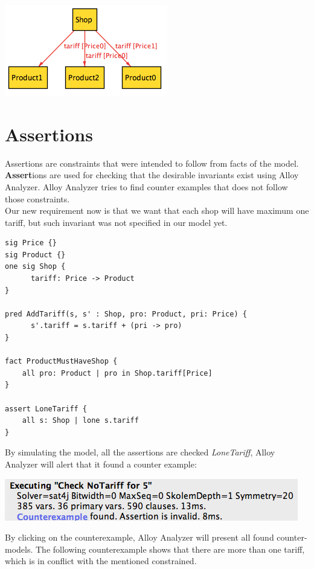 \documentclass[oneside]{book}
\begin{document}
\begin{center}
\includegraphics[scale=0.6]{shop5}
\end{center}

\newpage

\section{Assertions}
Assertions are constraints that were intended to follow from facts of the model. \textbf{Assert}ions are used for checking that the desirable invariants exist using Alloy Analyzer. Alloy Analyzer tries to find counter examples that does not follow those constraints.\\

Our new requirement now is that we want that each shop will have maximum one tariff, but such invariant was not specified in our model yet.

\begin{lstlisting}
sig Price {}
sig Product {}
one sig Shop {
	  tariff: Price -> Product
}

pred AddTariff(s, s' : Shop, pro: Product, pri: Price) {
	  s'.tariff = s.tariff + (pri -> pro)
}

fact ProductMustHaveShop {
	all pro: Product | pro in Shop.tariff[Price]
}

assert LoneTariff {
	all s: Shop | lone s.tariff
}
\end{lstlisting}

By simulating the model, all the assertions are checked \textit{LoneTariff}, Alloy Analyzer will alert that it found a counter example:

\begin{center}
\includegraphics[scale=0.6]{counterexample}
\end{center}

By clicking on the counterexample, Alloy Analyzer will present all found counter-models. The following counterexample shows that there are more than one tariff, which is in conflict with the mentioned constrained. 
\end{document}
